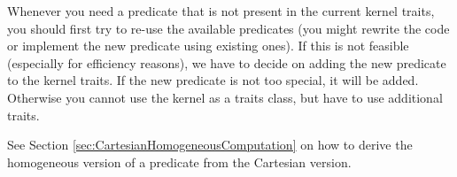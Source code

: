 
Whenever you need a predicate that is not present in the current kernel
traits, you should first try to re-use the available predicates (you
might rewrite the code or implement the new predicate using existing ones).
If this is not feasible (especially for efficiency reasons), we have to 
decide on adding the new predicate to the kernel traits. 
If the new predicate is not too special, it will be added. 
Otherwise you cannot use the kernel as a traits class, but have
to use additional traits.%

See Section \ref{sec:CartesianHomogeneousComputation} on how to derive the
homogeneous version of a predicate from the Cartesian version. 


